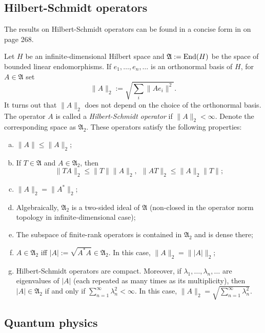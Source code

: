 \subsection{Hilbert-Schmidt operators}
The results on Hilbert-Schmidt operators can be found in a concise form in \cite{conway} on page 268.

Let $H$ be an infinite-dimensional Hilbert space and $\mathfrak A:= \operatorname{End}(H)$ be the space of bounded linear endomorphisms. If $e_1,\ldots,e_n,\ldots$ is an orthonormal basis of $H$, for $A \in \mathfrak A$ set
\[
\|A\|_2 := \sqrt{\sum_i \|Ae_i\|^2}.
\]
It turns out that $\|A\|_2$ does not depend on the choice of the orthonormal basis. The operator $A$ is called a \emph{Hilbert-Schmidt operator} if $\|A\|_2 < \infty$. Denote the corresponding space as $\mathfrak A_2$. These operators satisfy the following properties:
\begin{enumerate}[(a)]
\item $\|A\| \leq \|A\|_2$;
\item If $T \in \mathfrak A$ and $A \in \mathfrak A_2$, then
\[
\|TA\|_2 \leq \|T\| \|A\|_2, \ \ \|AT\|_2 \leq \|A\|_2 \|T\|;
\]
\item $\|A\|_2=\|A^*\|_2$;
\item Algebraically, $\mathfrak A_2$ is a two-sided ideal of $\mathfrak A$ (non-closed in the operator norm topology in infinite-dimensional case);
\item The subspace of finite-rank operators is contained in $\mathfrak A_2$ and is dense there;
\item $A \in \mathfrak A_2$ iff $|A|:= \sqrt{A^*A} \in \mathfrak A_2$. In this case, $\|A\|_2 = \||A|\|_2$;
\item Hilbert-Schmidt operators are compact. Moreover, if $\lambda_1,\ldots,\lambda_n,\ldots$ are eigenvalues of $|A|$ (each repeated as many times as its multiplicity), then $|A| \in \mathfrak A_2$ if and only if $\sum_{n=1}^\infty \lambda_n^2 < \infty$. In this case, $\|A\|_2 = \sqrt{\sum_{n=1}^\infty \lambda_n^2}$.
\end{enumerate}
\subsection{Quantum physics}
